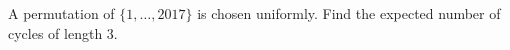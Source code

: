 A permutation of $\{1,\ldots,2017\}$ is chosen uniformly. Find the expected number of cycles of length 3.
